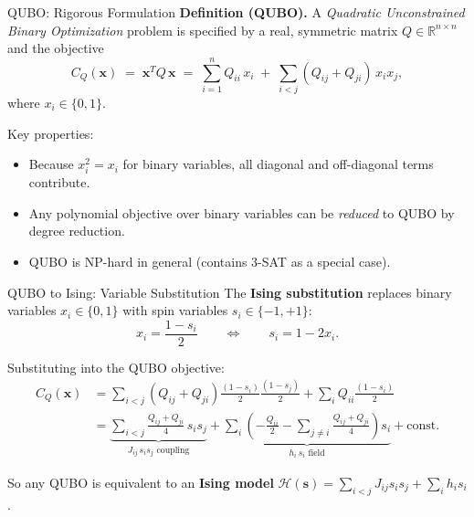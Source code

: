 \documentclass{beamer}
\begin{document}
\begin{frame}{QUBO: Rigorous Formulation}
\textbf{Definition (QUBO).}  A \emph{Quadratic Unconstrained Binary
Optimization} problem is specified by a real, symmetric matrix
$Q\in\mathbb{R}^{n\times n}$ and the objective
\[
\boxed{
C_Q(\mathbf{x}) \;=\; \mathbf{x}^T Q\,\mathbf{x}
\;=\; \sum_{i=1}^n Q_{ii}\,x_i
\;+\; \sum_{i<j}(Q_{ij}+Q_{ji})\,x_i x_j,}
\]
where $x_i\in\{0,1\}$.

Key properties:
\begin{itemize}
\item Because $x_i^2 = x_i$ for binary variables, all diagonal and
  off-diagonal terms contribute.
\item Any polynomial objective over binary variables can be
  \emph{reduced} to QUBO by degree reduction.
\item QUBO is NP-hard in general (contains 3-SAT as a special case).
\end{itemize}
\end{frame}


\begin{frame}{QUBO to Ising: Variable Substitution}
The \textbf{Ising substitution} replaces binary variables
$x_i\in\{0,1\}$ with spin variables $s_i\in\{-1,+1\}$:
\[
x_i = \frac{1 - s_i}{2}
\qquad\Longleftrightarrow\qquad
s_i = 1 - 2x_i.
\]

Substituting into the QUBO objective:
\begin{align*}
C_Q(\mathbf{x})
&= \sum_{i<j}(Q_{ij}+Q_{ji})
   \frac{(1-s_i)}{2}\frac{(1-s_j)}{2}
   + \sum_i Q_{ii}\frac{(1-s_i)}{2}\\[4pt]
&= \underbrace{\sum_{i<j} \frac{Q_{ij}+Q_{ji}}{4}\,s_i s_j}_{J_{ij}\,s_i s_j\text{ coupling}}
   + \underbrace{\sum_i \left(-\frac{Q_{ii}}{2}
   - \sum_{j\neq i}\frac{Q_{ij}+Q_{ji}}{4}\right)s_i}_{h_i\,s_i\text{ field}}
   + \text{const.}
\end{align*}

So any QUBO is equivalent to an \textbf{Ising model}
$\mathcal{H}(\mathbf{s}) = \sum_{i<j}J_{ij}s_is_j + \sum_i h_i s_i$.
\end{frame}

\end{document}
